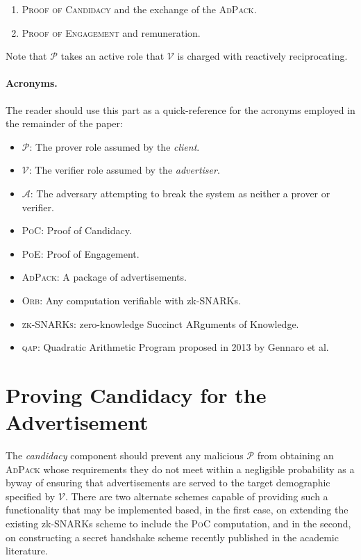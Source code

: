 \documentclass{article}
\begin{document}
			\begin{enumerate}
				
				\item \textsc{Proof of Candidacy }and the exchange of the \textsc{AdPack}.
				\item \textsc{Proof of Engagement} and remuneration.
		
			\end{enumerate}
		
		Note that $\mathcal{P}$ takes an active role that $\mathcal{V}$ is charged with reactively reciprocating. 
		
		\paragraph{Acronyms.} The reader should use this part as a quick-reference for the acronyms employed in the remainder of the paper:
		
			\begin{itemize}[label = $\cdot$]
				
				\item $\mathcal{P}$: The prover role  assumed by the \textit{client}.
				\item $\mathcal{V}$: The verifier role assumed by the \textit{advertiser}.
				\item $\mathcal{A}$: The adversary attempting to break the system as neither a prover or verifier.
				\item \textsc{PoC}: Proof of Candidacy.
				\item \textsc{PoE}: Proof of Engagement.
				\item \textsc{AdPack}: A package of advertisements.
				\item \textsc{Orb}: Any computation verifiable with zk-SNARKs.
				\item \textsc{zk-SNARKs}: zero-knowledge Succinct ARguments of Knowledge.
				\item \textsc{qap}: Quadratic Arithmetic Program proposed in 2013 by Gennaro et al.
				
			\end{itemize}
		
\pagebreak
		
	\section{Proving Candidacy for the Advertisement}
		
		The \textit{candidacy} component should prevent any malicious $\mathcal{P}$ from obtaining an \textsc{AdPack} whose requirements they do not meet within a negligible probability as a byway of ensuring that advertisements are served to the target demographic specified by $\mathcal{V}$. There are two alternate schemes capable of providing such a functionality that  may be implemented based, in the first case, on extending the existing zk-SNARKs scheme to include the \textsc{PoC} computation, and in the second, on constructing a secret handshake scheme recently published in the academic literature.
		
\end{document}

